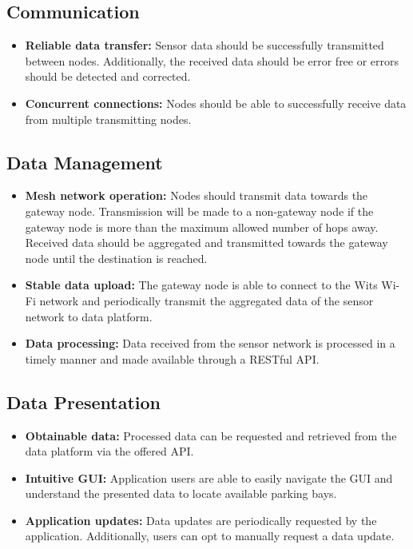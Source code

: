 \documentclass[10pt,twocolumn]{witseiepaper}
\begin{document}
	\subsection{Communication}
		\begin{itemize}
			\item \textbf{Reliable data transfer:} Sensor data should be successfully transmitted between nodes. Additionally, the received data should be error free or errors should be detected and corrected.
			\vspace{1em}
			\item \textbf{Concurrent connections:} Nodes should be able to successfully receive data from multiple transmitting nodes.
		\end{itemize}
	
	\subsection{Data Management}
		\begin{itemize}
			\item \textbf{Mesh network operation:} Nodes should transmit data towards the gateway node. Transmission will be made to a non-gateway node if the gateway node is more than the maximum allowed number of hops away. Received data should be aggregated and transmitted towards the gateway node until the destination is reached.
			\vspace{1em}
			\item \textbf{Stable data upload:} The gateway node is able to connect to the Wits Wi-Fi network and periodically transmit the aggregated data of the sensor network to data platform.
			\vspace{1em}
			\item \textbf{Data processing:} Data received from the sensor network is processed in a timely manner and made available through a RESTful API.
		\end{itemize}
	
	\subsection{Data Presentation}
		\begin{itemize}
			\item \textbf{Obtainable data:} Processed data can be requested and retrieved from the data platform via the offered API.
			\vspace{1em}
			\item \textbf{Intuitive GUI:} Application users are able to easily navigate the GUI and understand the presented data to locate available parking bays.
			\vspace{1em}
			\item \textbf{Application updates:} Data updates are periodically requested by the application. Additionally, users can opt to manually request a data update.
		\end{itemize}
\end{document}

